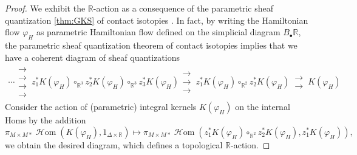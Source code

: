 \documentclass[11pt]{amsart}
\numberwithin{equation}{section}
\theoremstyle{plain}
\theoremstyle{definition}
\theoremstyle{remark}
\newcommand{\bR} { {\mathbb{R}}}
\newcommand\sHom{\operatorname{\mathscr{H}om}}
\begin{document}
\begin{proof}
We exhibit the $\bR$-action as a consequence of the parametric sheaf quantization \autoref{thm:GKS} of contact isotopies \cite[Remark 4.9]{GKS2012}. In fact, by writing the Hamiltonian flow $\varphi_H$ as parametric Hamiltonian flow defined on the simplicial diagram $B_\bullet\bR$, the parametric sheaf quantization theorem of contact isotopies implies that we have a coherent diagram of sheaf quantizations
\begin{align*}
\cdots \substack{\longrightarrow \\[-0.8em] \longrightarrow \\[-0.8em] \longrightarrow \\[-0.8em] \longrightarrow }\, z_1^*K(\varphi_H) \circ_{\bR^3} z_2^*K(\varphi_H) \circ_{\bR^3} z_3^*K(\varphi_H) \substack{\longrightarrow \\[-0.8em] \longrightarrow \\[-0.8em] \longrightarrow }\, z_1^*K(\varphi_H) \circ_{\bR^2} z_2^*K(\varphi_H) \,\substack{\longrightarrow \\[-0.8em] \longrightarrow }\, K(\varphi_H) 
\end{align*}
Consider the action of (parametric) integral kernels $K(\varphi_H)$ on the internal Homs by the addition 
\[\pi_{M\times M*}\sHom(K(\varphi_H), 1_{\Delta \times \bR}) \mapsto \pi_{M\times M*}\sHom(z_1^*K(\varphi_H) \circ_{\bR^2} z_2^*K(\varphi_H), z_1^*K(\varphi_H)),\]
we obtain the desired diagram, which defines a topological $\bR$-action.
\end{proof}
\end{document}
